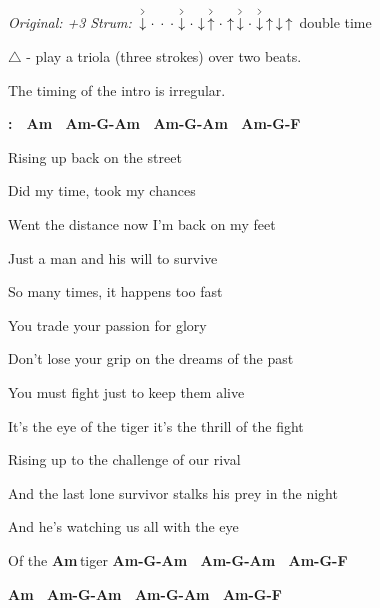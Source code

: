 \begin{song}


\begin{headerbox}
\RaiseBoxWithAccents
\textit{Original: +3} \quad
\textit{Strum:} $\AccentDown\Miss\Miss\Miss\AccentDown\Miss\Down\AccentUp \Miss\Up\AccentDown\Miss\AccentDown\Up\Down\Up$ double time
\end{headerbox}

\begin{hchordbox}
\end{hchordbox}

\Large


\bigskip

{
\smaller $\triangle$ - play a triola (three strokes) over two beats. \par
The timing of the intro is irregular.
}

\bigskip

\Intro\textbf{:}\ \  
\textbf{Am \ Am-G-Am \ Am-G-Am \ Am-G-F \ }  \par

\bigskip

 Rising up back on the street \par
{} Did my time, took my chances \par
{} Went the distance now I’m back on my feet \par
Just a \ch{G}man and his will to sur\ch{Am}vive \par

\bigskip

 So many times, it happens too fast \par
{} You trade your passion for glory \par
{} Don’t lose your grip on the dreams of the past \par
You must \ch{G}fight just to keep them a\ch{Am}live \par

\bigskip

\begin{chorusbox}{\Chorus}
It’s the  eye of the tiger it’s the thrill of the fight \par
Rising up to the challenge of our \ch{C\beat}ri\ch{G\beats3}val \par
And the \ch{Dm}last lone survivor stalks his \ch{C\beats2}prey in the night \par
And he’s \ch{Dm\suptriangle}watching us \ch{C\suptriangle}all with the \ch{F\rep2}eye \par
Of the \textbf{Am\,}tiger \textbf{Am-G-Am \ Am-G-Am \ Am-G-F \ } \par
\textbf{Am \ Am-G-Am \ Am-G-Am \ Am-G-F \ } \par
\end{chorusbox}


\end{song}
